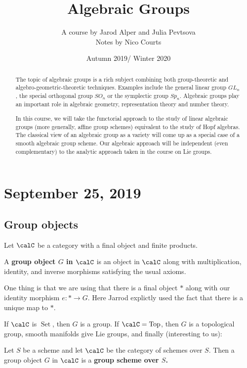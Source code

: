 \documentclass[12pt]{article}
\begin{document}
\title{Algebraic Groups\vspace{-1ex}}
\author{A course by Jarod Alper and Julia Pevtsova\\
Notes by Nico Courts}
\date{Autumn 2019/ Winter 2020}
\maketitle

\begin{abstract}
	The topic of algebraic groups is a rich subject combining both group-theoretic and algebro-geometric-theoretic techniques. Examples include the general linear group $GL_n$, 
	the special orthogonal group $SO_n$ or the symplectic group $Sp_n$. Algebraic groups play an important role in algebraic geometry, representation theory and number theory.

	In this course, we will take the functorial approach to the study of linear algebraic groups (more generally, affine group schemes) equivalent to the study of Hopf algebras. 
	The classical view of an algebraic group as a variety will come up as a special case of a smooth algebraic group scheme. Our algebraic approach will be independent (even complementary) to the analytic approach taken in the course on Lie groups.
\end{abstract}

\section{September 25, 2019}
\subsection{Group objects}
Let $\calC$ be a category with a final object and finite products.
\begin{defn}
	A \textbf{group object $G$ in $\calC$} is an object in $\calC$ along with multiplication, identity, and inverse morphisms
	satisfying the usual axioms.
\end{defn}

One thing is that we are using that there is a final object $\ast$ along with our identity morphism $e:\ast\to G$.
Here Jarrod explictly used the fact that there is a unique map to $\ast$.

\begin{ex}
	If $\calC$ is $\operatorname{Set}$, then $G$ is a group. If $\calC=\operatorname{Top}$, then $G$ is a topological group, smooth manifolds give Lie groups, and finally (interesting to us):
\end{ex}
\begin{defn}
	Let $S$ be a scheme and let $\calC$ be the category of schemes over $S$. Then a group object $G$ in $\calC$ is 
	a \textbf{group scheme over $S$.}
\end{defn}
\end{document}
